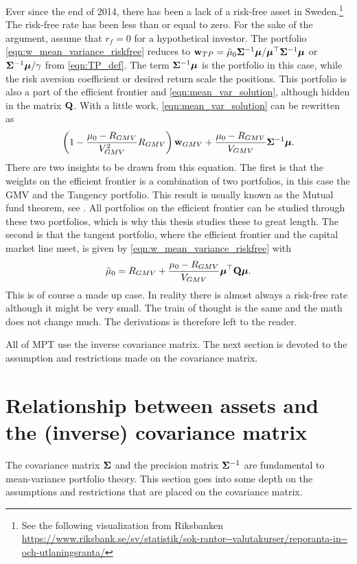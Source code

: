 \documentclass[12pt, oneside]{book}\usepackage{knitr}
\begin{document}
{Ever since the end of 2014, there has been a lack of a risk-free asset in Sweden.\footnote{See the following visualization from Riksbanken \url{https://www.riksbank.se/sv/statistik/sok-rantor--valutakurser/reporanta-in--och-utlaningsranta/}} 
The risk-free rate has been less than or equal to zero. 
For the sake of the argument, assume that $r_f=0$ for a hypothetical investor.
The portfolio \eqref{eqn:w_mean_variance_riskfree} reduces to $\mathbf{w}_{TP} = \tilde\mu_0 \mathbf{\Sigma}^{-1} \mbox{\boldmath$\mu$} / \mbox{\boldmath$\mu$}^\top \mathbf{\Sigma}^{-1} \mbox{\boldmath$\mu$}$ or $\mathbf{\Sigma}^{-1}\mbox{\boldmath$\mu$} / \gamma$ from \eqref{eqn:TP_def}. 
The term $\mathbf{\Sigma}^{-1} \mbox{\boldmath$\mu$}$ is the portfolio in this case, while the risk aversion coefficient or desired return scale the positions.
This portfolio is also a part of the efficient frontier and \eqref{eqn:mean_var_solution}, although hidden in the matrix $\mathbf{Q}$. 
With a little work, \eqref{eqn:mean_var_solution} can be rewritten as
$$
\left(1 - \frac{\mu_0-R_{GMV}}{V_{GMV}^2} R_{GMV} \right) \mathbf{w}_{GMV} + \frac{\mu_0-R_{GMV}}{V_{GMV}} \mathbf{\Sigma}^{-1} \mbox{\boldmath$\mu$}.
$$
There are two insights to be drawn from this equation. 
The first is that the weights on the efficient frontier is a combination of two portfolios, in this case the GMV and the Tangency portfolio. 
This result is usually known as the Mutual fund theorem, see \citet{tobin1958liquidity}.
All portfolios on the efficient frontier can be studied through these two portfolios, which is why this thesis studies these to great length.
The second is that the tangent portfolio, where the efficient frontier and the capital market line meet, is given by \eqref{eqn:w_mean_variance_riskfree} with 
$$
\tilde\mu_0 = R_{GMV} + \frac{\mu_0-R_{GMV}}{V_{GMV}} \mbox{\boldmath$\mu$}^\top \mathbf{Q} \mbox{\boldmath$\mu$}.
$$
This is of course a made up case.
In reality there is almost always a risk-free rate although it might be very small.
The train of thought is the same and the math does not change much.
The derivations is therefore left to the reader.

All of MPT use the inverse covariance matrix. 
The next section is devoted to the assumption and restrictions made on the covariance matrix.  

\section{Relationship between assets and the (inverse) covariance matrix}\label{sec:cov_prec_matrix}
The covariance matrix $\mathbf{\Sigma}$ and the precision matrix $\mathbf{\Sigma}^{-1}$ are fundamental to mean-variance portfolio theory. 
This section goes into some depth on the assumptions and restrictions that are placed on the covariance matrix.

}
\end{document}
